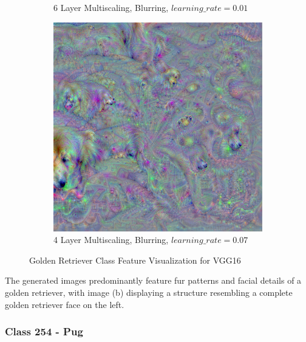 \begin{figure}
\begin{subfigure}[t]{0.31\textwidth}
        \caption{6 Layer Multiscaling, Blurring, \(learning\_rate = 0.01\)}
    \end{subfigure}
    \hfill
    \begin{subfigure}[t]{0.31\textwidth}
        \captionsetup{justification=centering}
        \centering
        \includegraphics[width=.7\linewidth]{figuras/feat_vis/experiments/classes/cl207/random_image_ci207_lr7e-2_pl4.png}
        \caption{4 Layer Multiscaling, Blurring, \(learning\_rate = 0.07\)}
    \end{subfigure}

    \caption{Golden Retriever Class Feature Visualization for VGG16}
    \label{fig:class_golden_retriever}
\end{figure}

The generated images predominantly feature fur patterns and facial details of a golden retriever, with image (b) displaying a structure resembling a complete golden retriever face on the left.

\subsubsection{Class 254 - Pug}


